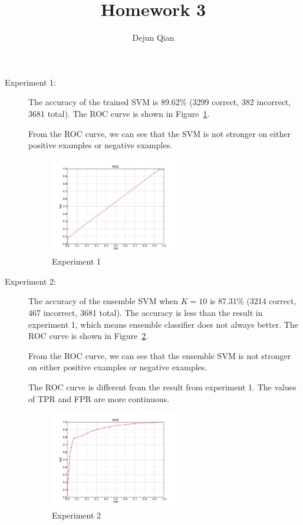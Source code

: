 \documentclass[11pt,letterpaper,oneside]{article}
\title{Homework 3}
\author{Dejun Qian}
\date{}
\begin{document}
\maketitle

\begin{description}

\item[Experiment 1:] The accuracy of the trained SVM is 89.62\% (3299 correct, 382 incorrect, 3681 total). The ROC curve is shown in Figure~\ref{fig1}.

From the ROC curve, we can see that the SVM is not stronger on either positive examples or negative examples.

\begin{figure}
\begin{center}
\includegraphics[width=0.55\textwidth]{fig1}
\caption{Experiment 1}
\label{fig1}
\end{center}
\end{figure}

\item[Experiment 2:] The accuracy of the ensemble SVM when $K=10$ is 87.31\% (3214 correct, 467 incorrect, 3681 total). The accuracy is less than the result in experiment 1, which means ensemble classifier does not always better. The ROC curve is shown in Figure~\ref{fig2}.

From the ROC curve, we can see that the ensemble SVM is not stronger on either positive examples or negative examples.

The ROC curve is different from the result from experiment 1. The values of TPR and FPR are more continuous.

\begin{figure}
\begin{center}
\includegraphics[width=0.55\textwidth]{fig2}
\caption{Experiment 2}
\label{fig2}
\end{center}
\end{figure}


\end{description}
\end{document}
